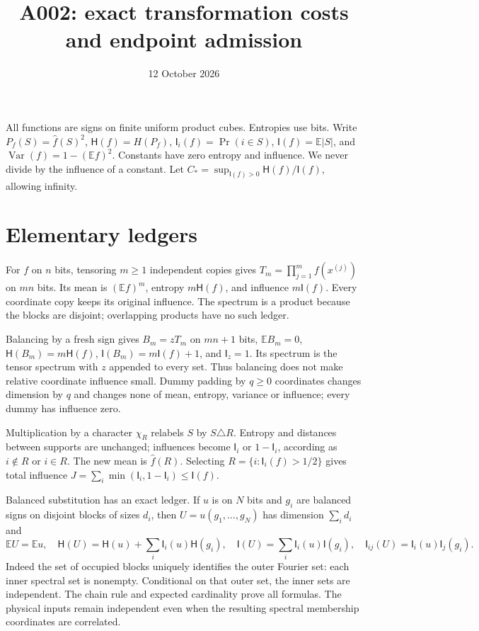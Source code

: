 \documentclass[11pt]{article}
\newcommand{\I}{\mathsf I}\newcommand{\HH}{\mathsf H}
\newcommand{\Var}{\operatorname{Var}}
\newcommand{\E}{\mathbb E}
\begin{document}
\title{A002: exact transformation costs and endpoint admission}
\date{12 October 2026}\maketitle
All functions are signs on finite uniform product cubes. Entropies use bits.
Write $P_f(S)=\widehat f(S)^2$, $\HH(f)=H(P_f)$,
$\I_i(f)=\Pr(i\in S)$, $\I(f)=\E|S|$, and
$\Var(f)=1-(\E f)^2$. Constants have zero entropy and influence.
We never divide by the influence of a constant. Let
$C_*=\sup_{\I(f)>0}\HH(f)/\I(f)$, allowing infinity.

\section{Elementary ledgers}
For $f$ on $n$ bits, tensoring $m\ge1$ independent copies gives
$T_m=\prod_{j=1}^m f(x^{(j)})$ on $mn$ bits. Its mean is
$(\E f)^m$, entropy $m\HH(f)$, and influence $m\I(f)$.
Every coordinate copy keeps its original influence. The spectrum is a product
because the blocks are disjoint; overlapping products have no such ledger.

Balancing by a fresh sign gives $B_m=zT_m$ on $mn+1$ bits,
$\E B_m=0$, $\HH(B_m)=m\HH(f)$,
$\I(B_m)=m\I(f)+1$, and $\I_z=1$.
Its spectrum is the tensor spectrum with $z$ appended to every set.
Thus balancing does not make relative coordinate influence small.
Dummy padding by $q\ge0$ coordinates changes dimension by $q$ and changes
none of mean, entropy, variance or influence; every dummy has influence zero.

Multiplication by a character $\chi_R$ relabels $S$ by $S\triangle R$.
Entropy and distances between supports are unchanged; influences become
$\I_i$ or $1-\I_i$, according as $i\notin R$ or $i\in R$.
The new mean is $\widehat f(R)$. Selecting
$R=\{i:\I_i(f)>1/2\}$ gives total influence
$J=\sum_i\min(\I_i,1-\I_i)\le\I(f)$.

Balanced substitution has an exact ledger. If $u$ is on $N$ bits and
$g_i$ are balanced signs on disjoint blocks of sizes $d_i$, then
$U=u(g_1,\ldots,g_N)$ has dimension $\sum_i d_i$ and
\[
 \E U=\E u,\quad \HH(U)=\HH(u)+\sum_i\I_i(u)\HH(g_i),
 \quad \I(U)=\sum_i\I_i(u)\I(g_i),
 \quad \I_{ij}(U)=\I_i(u)\I_j(g_i).
\]
Indeed the set of occupied blocks uniquely identifies the outer Fourier set:
each inner spectral set is nonempty. Conditional on that outer set, the inner
sets are independent. The chain rule and expected cardinality prove all formulas.
The physical inputs remain independent even when the resulting spectral
membership coordinates are correlated.
\end{document}
